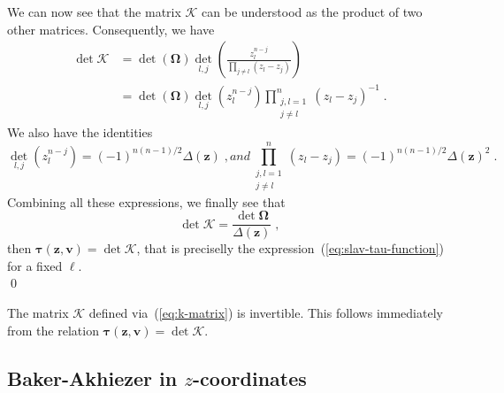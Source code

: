 \documentclass[a4paper,11pt]{amsart}
\begin{document}
We can now see that the matrix \(\bm{\mathcal{K}}\) can be understood
as the product of two other matrices. Consequently, we have
\begin{equation}
  \begin{split}
  \det \bm{\mathcal{K}} & = \det(\bm{\Omega}) \det_{l,j}\left( \frac{z_l^{n-j}}{\prod_{j\neq l} (z_l - z_j)}\right) \\
  & = \det(\bm{\Omega}) \det_{l, j}(z_l^{n-j}) \prod_{\substack{j, l =1 \\ j \neq l}}^n (z_l - z_j)^{-1} \; .
  \end{split}
\end{equation}
We also have the identities 
\begin{subequations}
  \begin{equation}
	\det_{l,j}(z_l^{n-j}) = (-1)^{n(n-1)/2} \Delta(\bm{z})\; ,
  \end{equation}
  and
  \begin{equation}
	\prod_{\substack{j, l = 1 \\ j \neq l}}^n (z_l - z_j) = (-1)^{n(n-1)/2} \Delta(\bm{z})^2\; . 
  \end{equation}
\end{subequations}
Combining all these expressions, we finally see that
\begin{equation}
  \det \bm{\mathcal{K}} = \frac{\det \bm{\Omega}}{\Delta(\bm{z})}\; ,
\end{equation}
then \(\bm{\tau}(\bm{z}, \bm{v}) = \det\bm{\mathcal{K}}\), that is
preciselly the expression~(\ref{eq:slav-tau-function}) for a fixed
\(\ell\). \\ \qed

\begin{lemma}
\label{lemma:k-invert}
The matrix \(\bm{\mathcal{K}}\) defined via~(\ref{eq:k-matrix}) is
invertible. This follows immediately from the relation
\(\bm{\tau}(\bm{z}, \bm{v}) = \det \bm{\mathcal{K}}\).
\end{lemma}

\subsection{Baker-Akhiezer in \(z\)-coordinates}
\end{document}
